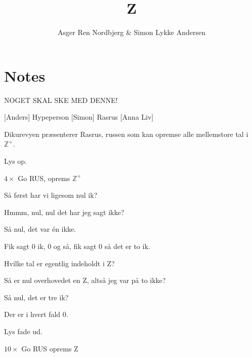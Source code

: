 \documentclass{article}
\title{Z}                   %
\author{Asger Ren Nordbjerg \& Simon Lykke Andersen}  %
\begin{document}
                
\maketitle
\section*{Notes}
NOGET SKAL SKE MED DENNE!

\begin{roles}
[Anders] Hypeperson
[Simon] Rasrus
[Anna Liv]
\end{roles}


\newpage%
\begin{sketch}

Dikurevyen præsenterer Rasrus, russen som kan opremse alle mellemstore tal i $\mathbb{Z}^+$.

\scene{}
Lys op.

$4\times$ Go RUS, oprems $\mathbb{Z}^+$ 

Så først har vi ligesom nul ik?

Hmmm, nul, nul det har jeg sagt ikke?

Så nul, det var én ikke.

Fik sagt 0 ik, 0 og så, fik sagt 0 så det er to ik.

Hvilke tal er egentlig indeholdt i Z?

Så er nul overhovedet en Z, altså jeg var på to ikke?

Så nul, det er tre ik? 

Der er i hvert fald 0.

\scene{}
Lys fade ud.

$10\times$ Go RUS oprems Z


\end{sketch}
\end{document}
